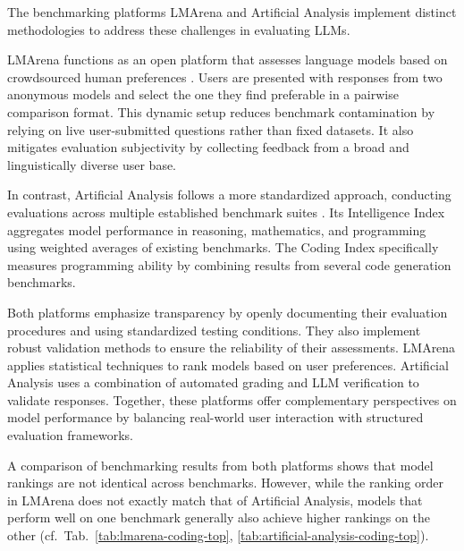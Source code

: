 \vspace{\baselineskip}
The benchmarking platforms LMArena and Artificial Analysis implement distinct methodologies to address these challenges in evaluating LLMs.

LMArena functions as an open platform that assesses language models based on crowdsourced human preferences \cite{lmarena-paper}.
Users are presented with responses from two anonymous models and select the one they find preferable in a pairwise comparison format.
This dynamic setup reduces benchmark contamination by relying on live user-submitted questions rather than fixed datasets.
It also mitigates evaluation subjectivity by collecting feedback from a broad and linguistically diverse user base.

In contrast, Artificial Analysis follows a more standardized approach, conducting evaluations across multiple established benchmark suites \cite{artificial-analysis-methodology}.
Its Intelligence Index aggregates model performance in reasoning, mathematics, and programming using weighted averages of existing benchmarks.
The Coding Index specifically measures programming ability by combining results from several code generation benchmarks.

Both platforms emphasize transparency by openly documenting their evaluation procedures and using standardized testing conditions.
They also implement robust validation methods to ensure the reliability of their assessments.
LMArena applies statistical techniques to rank models based on user preferences.
Artificial Analysis uses a combination of automated grading and LLM verification to validate responses.
Together, these platforms offer complementary perspectives on model performance by balancing real-world user interaction with structured evaluation frameworks.

A comparison of benchmarking results from both platforms shows that model rankings are not identical across benchmarks.
However, while the ranking order in LMArena does not exactly match that of Artificial Analysis, models that perform well on one benchmark generally also achieve higher rankings on the other (cf.\ Tab.\ \ref{tab:lmarena-coding-top}, \ref{tab:artificial-analysis-coding-top}).
